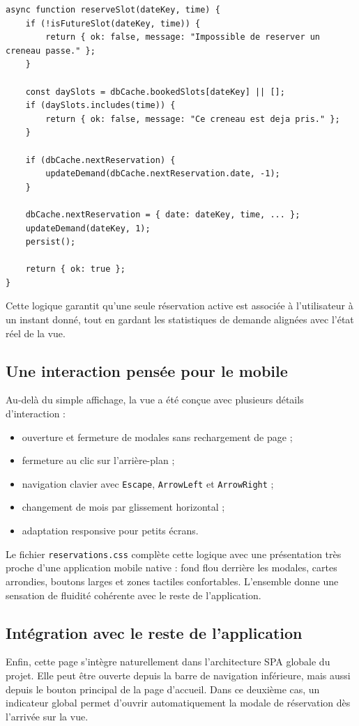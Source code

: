 \documentclass[12pt,a4paper]{article}
\begin{document}
\newpage

\begin{lstlisting}[caption={Principe simplifie de validation et de sauvegarde d'une reservation}]
async function reserveSlot(dateKey, time) {
    if (!isFutureSlot(dateKey, time)) {
        return { ok: false, message: "Impossible de reserver un creneau passe." };
    }

    const daySlots = dbCache.bookedSlots[dateKey] || [];
    if (daySlots.includes(time)) {
        return { ok: false, message: "Ce creneau est deja pris." };
    }

    if (dbCache.nextReservation) {
        updateDemand(dbCache.nextReservation.date, -1);
    }

    dbCache.nextReservation = { date: dateKey, time, ... };
    updateDemand(dateKey, 1);
    persist();

    return { ok: true };
}
\end{lstlisting}

Cette logique garantit qu'une seule réservation active est associée à l'utilisateur à un instant donné, tout en gardant les statistiques de demande alignées avec l'état réel de la vue.

\subsection*{Une interaction pensée pour le mobile}
Au-delà du simple affichage, la vue a été conçue avec plusieurs détails d'interaction :
\begin{itemize}
    \item ouverture et fermeture de modales sans rechargement de page ;
    \item fermeture au clic sur l'arrière-plan ;
    \item navigation clavier avec \texttt{Escape}, \texttt{ArrowLeft} et \texttt{ArrowRight} ;
    \item changement de mois par glissement horizontal ;
    \item adaptation responsive pour petits écrans.
\end{itemize}

Le fichier \texttt{reservations.css} complète cette logique avec une présentation très proche d'une application mobile native : fond flou derrière les modales, cartes arrondies, boutons larges et zones tactiles confortables. L'ensemble donne une sensation de fluidité cohérente avec le reste de l'application.

\subsection*{Intégration avec le reste de l'application}
Enfin, cette page s'intègre naturellement dans l'architecture SPA globale du projet. Elle peut être ouverte depuis la barre de navigation inférieure, mais aussi depuis le bouton principal de la page d'accueil. Dans ce deuxième cas, un indicateur global permet d'ouvrir automatiquement la modale de réservation dès l'arrivée sur la vue.
\end{document}

